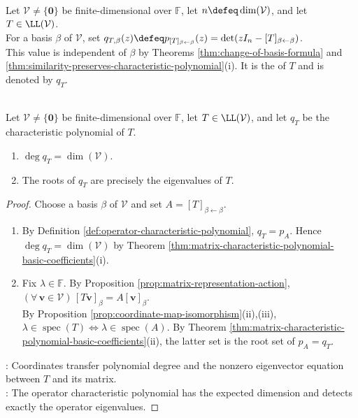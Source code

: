 \begin{definition} \label{def:operator-characteristic-polynomial} \\
Let $\mathcal{V}\neq\{\mathbf{0}\}$ be finite-dimensional over $\mathbb{F}$, let $n\defeq\dim(\mathcal{V})$, and let $T\in\LL(\mathcal{V})$.\\
For a basis $\beta$ of $\mathcal{V}$, set $q_{T,\beta}(z)\defeq p_{[T]_{\beta\leftarrow\beta}}(z)=\det(zI_n-[T]_{\beta\leftarrow\beta})$.\\
This value is independent of $\beta$ by Theorems \ref{thm:change-of-basis-formula} and \ref{thm:similarity-preserves-characteristic-polynomial}(i). It is the  of $T$ and is denoted by $q_T$.
\end{definition}

\begin{proposition} \label{prop:operator-characteristic-polynomial-degree-roots} \\
Let $\mathcal{V}\neq\{\mathbf{0}\}$ be finite-dimensional over $\mathbb{F}$, let $T\in\LL(\mathcal{V})$, and let $q_T$ be the characteristic polynomial of $T$.
\begin{enumerate}[label=(\roman*)]
\setlength{\itemsep}{0pt}
\item $\deg q_T=\dim(\mathcal{V})$.
\item The roots of $q_T$ are precisely the eigenvalues of $T$.
\end{enumerate}
\begin{proof}
Choose a basis $\beta$ of $\mathcal{V}$ and set $A=[T]_{\beta\leftarrow\beta}$.
\begin{enumerate}[label=(\roman*)]
\setlength{\itemsep}{0pt}
\item By Definition \ref{def:operator-characteristic-polynomial}, $q_T=p_A$. Hence $\deg q_T=\dim(\mathcal{V})$ by Theorem \ref{thm:matrix-characteristic-polynomial-basic-coefficients}(i).
\item Fix $\lambda\in\mathbb{F}$. By Proposition \ref{prop:matrix-representation-action}, $(\forall\,\mathbf{v}\in\mathcal{V})\,[T\mathbf{v}]_{\beta}=A[\mathbf{v}]_{\beta}$.\\
By Proposition \ref{prop:coordinate-map-isomorphism}(ii),(iii), $\lambda\in\operatorname{spec}(T)\Longleftrightarrow\lambda\in\operatorname{spec}(A)$. By Theorem \ref{thm:matrix-characteristic-polynomial-basic-coefficients}(ii), the latter set is the root set of $p_A=q_T$.
\end{enumerate}
: Coordinates transfer polynomial degree and the nonzero eigenvector equation between $T$ and its matrix.\\
: The operator characteristic polynomial has the expected dimension and detects exactly the operator eigenvalues.
\end{proof}
\end{proposition}
